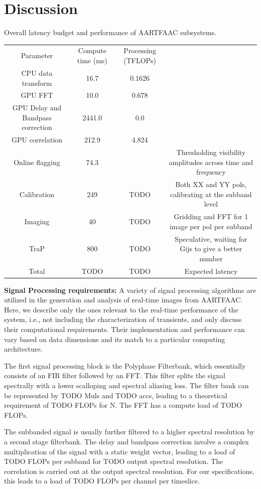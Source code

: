 \documentclass{ws-jai}
\begin{document}
\section {\label{sec:discussion} Discussion}
\begin{wstable}[h]
\caption{Overall latency budget and performance of AARTFAAC subsystems.}
\begin{tabular}{@{}cccc@{}} \toprule
Parameter & Compute time (ms) & Processing (TFLOPs)\\ \colrule
CPU data transform & 16.7 &0.1626  \\
GPU FFT & \hphantom{0}10.0&0.678  \\
GPU Delay and Bandpass correction & 2441.0 & 0.0\tnote{a}  \\
GPU correlation & 212.9 & 4.824  \\
Online flagging & 74.3 &  & Thresholding visibility amplitudes across time and frequency\\
Calibration & 249 & TODO & Both XX and YY pols, calibrating at the subband level \\
Imaging & 40 & TODO & Gridding and FFT for 1 image per pol per subband \\ 
TraP & 800 & TODO & Speculative, waiting for Gijs to give a better number\\
 \colrule
Total & TODO & TODO & Expected latency
\end{tabular}
\label{tab:afaac_specs}
\end{wstable}

\noindent \textbf {Signal Processing requirements:}
A variety  of signal processing  algorithms are  utilized in the  generation and
analysis of  real-time images from  AARTFAAC.  Here,  we describe only  the ones
relevant to  the real-time performance  of the  system, i.e., not  including the
characterization   of  transients,   and   only   discuss  their   computational
requirements.  Their  implementation and  performance  can  vary based  on  data
dimensions and its match to a particular computing architecture.

The first signal processing block is the Polyphase Filterbank, which essentially
consists of  an FIR  filter followed by  an FFT. This  filter splits  the signal
spectrally with a  lower scalloping and spectral aliasing loss.  The filter bank
can  be  represented by  TODO  Muls  and TODO  accs,  leading  to a  theoretical
requirement of TODO FLOPs for N. The FFT has a compute load of TODO FLOPs.

The subbanded signal is usually further filtered to a higher spectral resolution
by  a second  stage  filterbank. The  delay and  bandpass  correction involve  a
complex multiplication of  the signal with a static weight  vector, leading to a
load  of  TODO FLOPs  per  subband  for  TODO  output spectral  resolution.  The
correlation  is  carried  out  at   the  output  spectral  resolution.  For  our
specifications, this leads to a load of TODO FLOPs per channel per timeslice.
\end{document}
